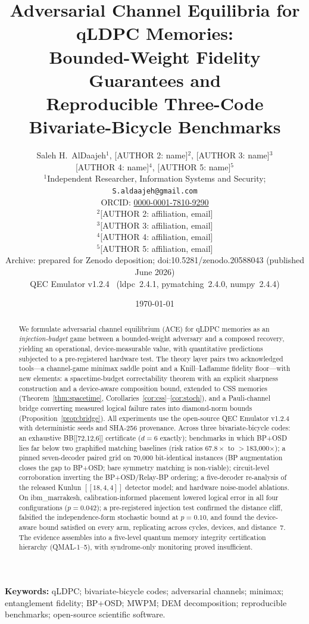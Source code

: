\documentclass[11pt,a4paper]{article}
\title{Adversarial Channel Equilibria for qLDPC Memories:\\
Bounded-Weight Fidelity Guarantees and\\
Reproducible Three-Code Bivariate-Bicycle Benchmarks}
\author{Saleh H.\ AlDaajeh$^{1}$, [AUTHOR 2: name]$^{2}$, [AUTHOR 3: name]$^{3}$\\[2pt]
[AUTHOR 4: name]$^{4}$, [AUTHOR 5: name]$^{5}$\\[4pt]
\small $^{1}$Independent Researcher, Information Systems and Security; \texttt{S.aldaajeh@gmail.com}\\
\small ORCID: \href{https://orcid.org/0000-0001-7810-9290}{0000-0001-7810-9290}\\
\small $^{2}$[AUTHOR 2: affiliation, email]\\
\small $^{3}$[AUTHOR 3: affiliation, email]\\
\small $^{4}$[AUTHOR 4: affiliation, email]\\
\small $^{5}$[AUTHOR 5: affiliation, email]\\[4pt]
\small Archive: prepared for Zenodo deposition; doi:10.5281/zenodo.20588043 (published June 2026)\\[2pt]
\small QEC Emulator v1.2.4~\cite{AlDaajeh2026emulator}
(ldpc~2.4.1, pymatching~2.4.0, numpy~2.4.4)}
\date{\today}
\begin{document}
\maketitle

\begin{abstract}
We formulate adversarial channel equilibrium (ACE) for qLDPC memories
as an \emph{injection-budget} game between a bounded-weight adversary
and a composed recovery, yielding an operational, device-measurable
value, with quantitative predictions subjected to a pre-registered
hardware test. The theory layer pairs two acknowledged tools---a channel-game minimax
saddle point and a Knill--Laflamme fidelity floor---with new elements: a spacetime-budget
correctability theorem with an explicit sharpness construction and a
device-aware composition bound, extended to CSS memories
(Theorem~\ref{thm:spacetime},
Corollaries~\ref{cor:css}--\ref{cor:stoch}), and a Pauli-channel bridge
converting measured logical failure rates into diamond-norm bounds
(Proposition~\ref{prop:bridge}). All experiments use the open-source
QEC Emulator v1.2.4 with deterministic seeds and SHA-256 provenance.
Across three bivariate-bicycle codes: an exhaustive BB[[72,12,6]]
certificate ($d=6$ exactly);
benchmarks in which BP+OSD lies far below two graphified
matching baselines (risk ratios $67.8\times$ to $>$183{,}000$\times$); a
pinned seven-decoder paired grid on 70{,}000 bit-identical instances (BP
augmentation closes the gap to BP+OSD; bare symmetry matching is
non-viable);
circuit-level corroboration inverting the BP+OSD/Relay-BP ordering; a
five-decoder re-analysis of the released Kunlun $[[18,4,4]]$
detector model; and hardware noise-model ablations. On
ibm\_marrakesh, calibration-informed placement lowered logical error in
all four configurations ($p=0.042$); a pre-registered
injection test confirmed the distance cliff, falsified the
independence-form stochastic bound at $p=0.10$, and found the
device-aware bound satisfied on every arm, replicating across cycles,
devices, and distance~7. The evidence assembles into a five-level
quantum memory integrity certification hierarchy (QMAL-1--5), with
syndrome-only monitoring proved insufficient.

\end{abstract}

\noindent\textbf{Keywords:} qLDPC; bivariate-bicycle codes; adversarial
channels; minimax; entanglement fidelity; BP+OSD; MWPM; DEM decomposition;
reproducible benchmarks; open-source scientific software.
\end{document}
